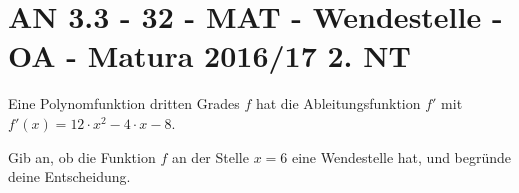 \section{AN 3.3 - 32 - MAT - Wendestelle - OA - Matura 2016/17 2. NT}

\begin{beispiel}{1} %
Eine Polynomfunktion dritten Grades $f$ hat die Ableitungsfunktion $f'$ mit $f'(x)=12\cdot x^2 - 4 \cdot x - 8$. \leer

Gib an, ob die Funktion $f$ an der Stelle $x=6$ eine Wendestelle hat, und begründe deine Entscheidung.


\end{beispiel}